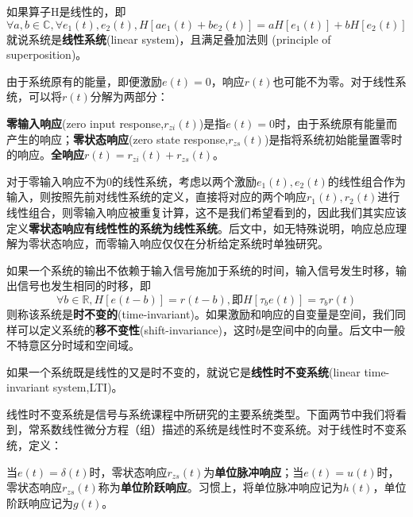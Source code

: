 \documentclass{ctexbook}
\begin{document}
\begin{definition}[线性系统]
    如果算子H是线性的，即
\[\forall a,b\in\mathbb{C},\forall e_1(t),e_2(t),H[ae_1(t)+be_2(t)]=aH[e_1(t)]+bH[e_2(t)]\]
就说系统是\textbf{线性系统}(linear system)，且满足叠加法则 (principle of superposition)。
\end{definition}

由于系统原有的能量，即便激励$e(t)=0$，响应$r(t)$也可能不为零。对于线性系统，可以将$r(t)$分解为两部分：
\begin{definition}[零输入响应与零状态响应]
   \textbf{零输入响应}(zero input response,$r_{zi}(t)$)是指$e(t)=0$时，由于系统原有能量而产生的响应；\textbf{零状态响应}(zero state response,$r_{zs}(t)$)是指将系统初始能量置零时的响应。\textbf{全响应}$r(t)=r_{zi}(t)+r_{zs}(t)$。
\end{definition}
对于零输入响应不为0的线性系统，考虑以两个激励$e_1(t),e_2(t)$的线性组合作为输入，则按照先前对线性系统的定义，直接将对应的两个响应$r_1(t),r_2(t)$进行线性组合，则零输入响应被重复计算，这不是我们希望看到的，因此我们其实应该定义\textbf{零状态响应有线性性的系统为线性系统}。后文中，如无特殊说明，响应总应理解为零状态响应，而零输入响应仅仅在分析给定系统时单独研究。

\begin{definition}[时不变性和移不变性]
    如果一个系统的输出不依赖于输入信号施加于系统的时间，输入信号发生时移，输出信号也发生相同的时移，即
    $$\forall b\in\mathbb{R},H[e(t-b)]=r(t-b),\text{即}H[\tau_b e(t)]=\tau_b r(t)$$
    则称该系统是\textbf{时不变的}(time-invariant)。如果激励和响应的自变量是空间，我们同样可以定义系统的\textbf{移不变性}(shift-invariance)，这时$b$是空间中的向量。后文中一般不特意区分时域和空间域。
\end{definition}
\begin{definition}[线性时不变系统]
    如果一个系统既是线性的又是时不变的，就说它是\textbf{线性时不变系统}(linear time-invariant system,LTI)。
\end{definition}

线性时不变系统是信号与系统课程中所研究的主要系统类型。下面两节中我们将看到，常系数线性微分方程（组）描述的系统是线性时不变系统。对于线性时不变系统，定义：

\begin{definition}[单位脉冲响应与单位阶跃响应]
    当$e(t)=\delta(t)$时，零状态响应$r_{zs}(t)$为\textbf{单位脉冲响应}；当$e(t)=u(t)$时，零状态响应$r_{zs}(t)$称为\textbf{单位阶跃响应}。习惯上，将单位脉冲响应记为$h(t)$，单位阶跃响应记为$g(t)$。
\end{definition}
\end{document}
